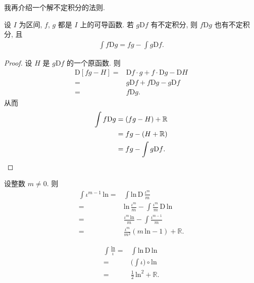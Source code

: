 我再介绍一个解不定积分的法则.

\begin{theorem}
    设 $I$ 为区间, $f$, $g$ 都是 $I$ 上的可导函数.
    若 $g\mathrm{D}f$ 有不定积分,
    则 $f\mathrm{D}g$ 也有不定积分, 且
    \begin{align*}
        \int {f\mathrm{D}g} = fg - \int {g\mathrm{D}f}.
    \end{align*}
\end{theorem}

\begin{proof}
    设 $H$ 是 $g\mathrm{D}f$ 的一个原函数.
    则
    \begin{align*}
        \mathrm{D}[fg - H]
        = {} & \mathrm{D}f \cdot g + f \cdot \mathrm{D}g - \mathrm{D}H \\
        = {} & g\mathrm{D}f + f\mathrm{D}g - g\mathrm{D}f              \\
        = {} & f\mathrm{D}g.
    \end{align*}
    从而
    \begin{align*}
        \int {f\mathrm{D}g}
        = {} & (fg - H) + \mathbb{R}              \\
        = {} & fg - (H + \mathbb{R})              \\
        = {} & fg - \int {g\mathrm{D}f}. \qedhere
    \end{align*}
\end{proof}

\begin{example}
    设整数 $m \neq 0$.
    则
    \begin{align*}
        \int {\iota^{m - 1} \, \mathrm{ln}}
        = {} & \int {\mathrm{ln}\, \mathrm{D}\,\frac{\iota^{m}}{m}} \\
        = {} & \mathrm{ln}\, \frac{\iota^{m}}{m}
        - \int {\frac{\iota^{m}}{m}\,\mathrm{D}\,\mathrm{ln}}       \\
        = {} & \frac{\iota^{m}\,\mathrm{ln}}{m}
        - \int {\frac{\iota^{m - 1}}{m}}                            \\
        = {} & \frac{\iota^{m}}{m^2}
        (m\,\mathrm{ln} - 1) + \mathbb{R}.
    \end{align*}
\end{example}

\begin{remark}
    \begin{align*}
        \int {\frac{\mathrm{ln}}{\iota}}
        = {} & \int {\mathrm{ln}\,\mathrm{D}\,\mathrm{ln}}  \\
        = {} & \Bigg( \int {\iota} \Bigg) \circ \mathrm{ln} \\
        = {} & \frac{1}{2}\, \mathrm{ln}^2 + \mathbb{R}.
    \end{align*}
\end{remark}

